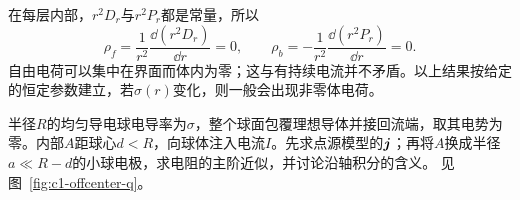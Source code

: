 \begin{solution}
在每层内部，$r^2D_r$与$r^2P_r$都是常量，所以
\[
 \rho_f=\frac1{r^2}\frac{\dd(r^2D_r)}{\dd r}=0,\qquad
 \rho_b=-\frac1{r^2}\frac{\dd(r^2P_r)}{\dd r}=0.
\]
自由电荷可以集中在界面而体内为零；这与有持续电流并不矛盾。以上结果按给定的恒定参数建立，若$\sigma(r)$变化，则一般会出现非零体电荷。
\end{solution}

\begin{example}[导电球内的偏心点源与小球电极]\label{ex:c1-offcenter}
半径$R$的均匀导电球电导率为$\sigma$，整个球面包覆理想导体并接回流端，取其电势为零。内部$A$距球心$d<R$，向球体注入电流$I$。先求点源模型的$\bm{j}$；再将$A$换成半径$a\ll R-d$的小球电极，求电阻的主阶近似，并讨论沿轴积分的含义。 见图~\ref{fig:c1-offcenter-q}。
\end{example}

